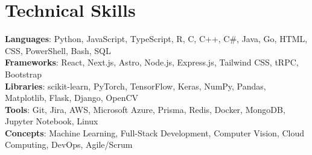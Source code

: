 \documentclass[letterpaper,11pt]{article}
\begin{document}
\section{Technical Skills}
 \begin{itemize}[leftmargin=0.15in, label={}]
    \small{\item{
     \textbf{Languages}{: Python, JavaScript, TypeScript, R, C, C++, C\#, Java, Go, HTML, CSS, PowerShell, Bash, SQL} \\
     \textbf{Frameworks}{: React, Next.js, Astro, Node.js, Express.js, Tailwind CSS, tRPC, Bootstrap} \\
     \textbf{Libraries}{: scikit-learn, PyTorch, TensorFlow, Keras, NumPy, Pandas, Matplotlib, Flask, Django, OpenCV} \\
     \textbf{Tools}{: Git, Jira, AWS, Microsoft Azure, Prisma, Redis, Docker, MongoDB, Jupyter Notebook, Linux} \\
    \textbf{Concepts}{: Machine Learning, Full-Stack Development, Computer Vision,
    Cloud Computing, DevOps, Agile/Scrum} \\
    }}
 \end{itemize}

\end{document}
